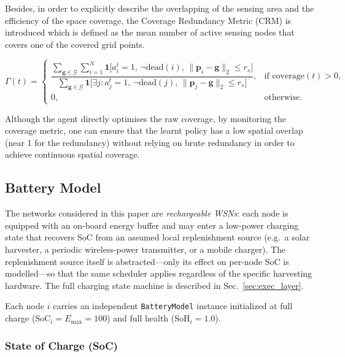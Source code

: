 \documentclass[journal]{IEEEtran}
\begin{document}
Besides, in order to explicitly describe the overlapping of the sensing area and the efficiency of the space coverage, the Coverage Redundancy Metric (CRM) is introduced which is defined as the mean number of active sensing nodes that covers one of the covered grid points.

\begin{equation}
  \Gamma(t) =
  \begin{cases}
    \dfrac{\displaystyle\sum_{\mathbf{g} \in \mathcal{G}}
           \sum_{i=1}^{N} \mathbf{1}\big[ a_i^t = 1,\,
           \neg\text{dead}(i),\,
           \|\mathbf{p}_i - \mathbf{g}\|_2 \leq r_s \big]}
          {\displaystyle\sum_{\mathbf{g} \in \mathcal{G}}
           \mathbf{1}\big[\exists j : a_j^t = 1,\,
           \neg\text{dead}(j),\,
           \|\mathbf{p}_j - \mathbf{g}\|_2 \leq r_s \big]},
      & \text{if } \text{coverage}(t) > 0, \\[6pt]
    0, & \text{otherwise.}
  \end{cases}
  \label{eq:redundancy}
\end{equation}

Although the agent directly optimises the raw coverage, by monitoring the coverage metric, one can ensure that the learnt policy has a low spatial overlap (near 1 for the redundancy) without relying on brute redundancy in order to achieve continuous spatial coverage.

\subsection{Battery Model}

The networks considered in this paper are \emph{rechargeable WSNs}:
each node is equipped with an on-board energy buffer and may enter a
low-power charging state that recovers SoC from an assumed local
replenishment source (e.g.\ a solar harvester, a periodic
wireless-power transmitter, or a mobile charger). The replenishment
source itself is abstracted---only its effect on per-node SoC is
modelled---so that the same scheduler applies regardless of the
specific harvesting hardware. The full charging state machine is
described in Sec.~\ref{sec:exec_layer}.

Each node $i$ carries an independent \texttt{BatteryModel} instance
initialized at full charge ($\text{SoC}_i = E_{\max} = 100$) and full
health ($\text{SoH}_i = 1.0$).

\subsubsection{State of Charge (SoC)}
\end{document}
